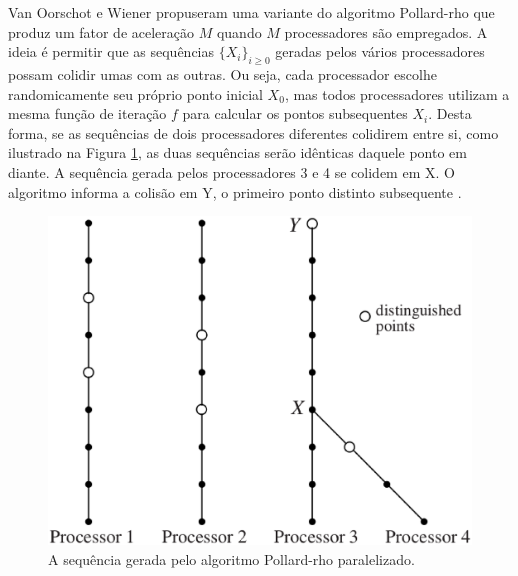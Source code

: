 Van Oorschot e Wiener propuseram uma variante do algoritmo Pollard-rho que produz um fator de aceleração \(M\) quando \(M\) processadores são empregados. A ideia é permitir que as sequências $\{X_i\}_{i \geq 0}$ geradas pelos vários processadores possam colidir umas com as outras. Ou seja, cada processador escolhe randomicamente seu próprio ponto inicial \(X_0\), mas todos processadores utilizam a mesma função de iteração \(f\) para calcular os pontos subsequentes \(X_i\). Desta forma, se as sequências de dois processadores diferentes colidirem entre si, como ilustrado na Figura \ref{fig:paralellized}, as duas sequências serão idênticas daquele ponto em diante. A sequência gerada pelos processadores 3 e 4 se colidem em X. O algoritmo informa a colisão em Y, o primeiro ponto distinto subsequente \cite{Van:1996}.

\begin{figure}[h]
\centering
\includegraphics[scale=0.4, bb=0 0 737 604]{figuras/paralellized.eps}
\caption{A sequência gerada pelo algoritmo Pollard-rho paralelizado. }
\label{fig:paralellized}
\end{figure}

